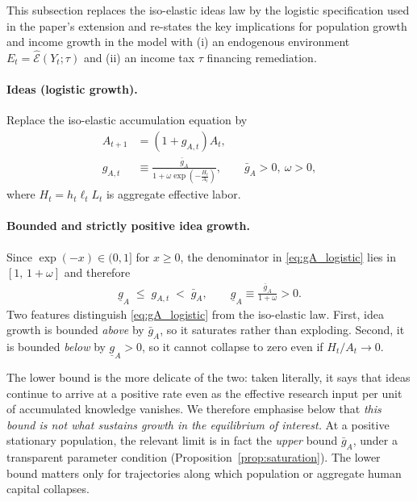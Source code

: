\documentclass[11pt]{article}
\begin{document}
This subsection replaces the iso-elastic ideas law by the logistic specification used in the paper’s extension
and re-states the key implications for population growth and income growth in the model with
(i) an endogenous environment $E_t=\widehat{\mathcal{E}}(Y_t;\tau)$ and (ii) an income tax $\tau$ financing remediation.

\paragraph{Ideas (logistic growth).}
Replace the iso-elastic accumulation equation by
\begin{align}
A_{t+1} &= (1+g_{A,t})A_t,
\label{eq:A_logistic}\\
g_{A,t} &\equiv \frac{\bar g_A}{1+\omega\exp\!\left(-\frac{H_t}{A_t}\right)},
\qquad \bar g_A>0,\ \omega>0,
\label{eq:gA_logistic}
\end{align}
where $H_t=h_t\ell_t L_t$ is aggregate effective labor.

\paragraph{Bounded and strictly positive idea growth.}
Since $\exp(-x)\in(0,1]$ for $x\ge 0$, the denominator in \eqref{eq:gA_logistic} lies in $[1,\,1+\omega]$ and therefore
\begin{align}
\underline g_A \;\le\; g_{A,t} \;<\; \bar g_A,
\qquad 
\underline g_A \equiv \frac{\bar g_A}{1+\omega}>0.
\label{eq:gA_bounds}
\end{align}
Two features distinguish \eqref{eq:gA_logistic} from the iso-elastic law. First, idea growth is
bounded \emph{above} by $\bar g_A$, so it saturates rather than exploding. Second, it is bounded
\emph{below} by $\underline g_A>0$, so it cannot collapse to zero even if $H_t/A_t\to 0$.

The lower bound is the more delicate of the two: taken literally, it says that ideas continue to
arrive at a positive rate even as the effective research input per unit of accumulated knowledge
vanishes. We therefore emphasise below that \emph{this bound is not what sustains growth in the
equilibrium of interest.} At a positive stationary population, the relevant limit is in fact the
\emph{upper} bound $\bar g_A$, under a transparent parameter condition
(Proposition~\ref{prop:saturation}). The lower bound matters only for trajectories along which
population or aggregate human capital collapses.
\end{document}
